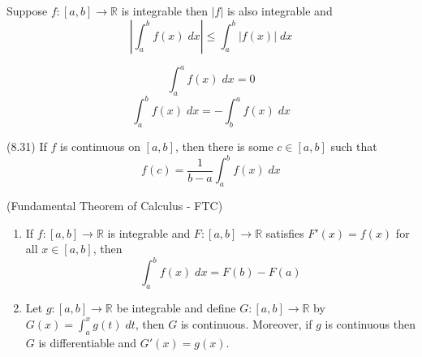 \documentclass[12pt]{article}
\begin{document}
\begin{corollary}{}{}
    Suppose $ f : \left[ a, b \right] \to \mathbb{R} $ is integrable then $ \left| f \right| $ is also integrable and
    \[ \left| \int_a^b f \left( x \right) \; dx \right| \leq \int_a^b \left| f \left( x \right) \right| \; dx \]
\end{corollary}
\begin{definition}{}{}
    \[ \int_a^a f \left( x \right) \; dx = 0 \]
    \[ \int_a^b f \left( x \right) \; dx = - \int_b^a f \left( x \right) \; dx \]
\end{definition}
\begin{proposition}{(8.31)}{}
    If $ f $ is continuous on $ \left[ a, b \right] $, then there is some $ c \in \left[ a, b \right] $ such that
    \[ f \left( c \right) = \frac{1}{b - a} \int_a^b f \left( x \right) \; dx \]
\end{proposition}
\begin{theorem}{(Fundamental Theorem of Calculus - FTC)}{}
    \begin{enumerate}
        \item If $ f : \left[ a, b \right] \to \mathbb{R} $ is integrable and $ F : \left[ a, b \right] \to \mathbb{R} $ satisfies $ F' \left( x \right) = f \left( x \right) $ for all $ x \in \left[ a, b \right] $, then 
        \[ \int_a^b f \left( x \right) \; dx = F \left( b \right) - F \left( a \right) \]
        \item Let $ g : \left[ a, b \right] \to \mathbb{R} $ be integrable and define $ G : \left[ a, b \right] \to \mathbb{R} $ by $ G \left( x \right) = \int_a^x g \left( t \right) \; dt $, then $ G $ is continuous. Moreover, if $ g $ is continuous then $ G $ is differentiable and $ G' \left( x \right) = g \left( x \right) $.
    \end{enumerate}
\end{theorem}
\end{document}
